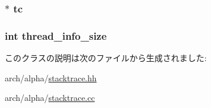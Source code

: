 \label{classAlphaISA_1_1ProcessInfo_a6bca839d8255baba5c53a5eace70d72e}
\hypertarget{classAlphaISA_1_1ProcessInfo_a4455a4759e69e5ebe68ae7298cbcc37d}{
\subsubsection[{tc}]{$\ast$ {\bf tc}}}
\label{classAlphaISA_1_1ProcessInfo_a4455a4759e69e5ebe68ae7298cbcc37d}
\hypertarget{classAlphaISA_1_1ProcessInfo_aa02520c2e86b94388e0d4f4a7b0873b3}{
\subsubsection[{thread\_\-info\_\-size}]{\setlength{\rightskip}{0pt plus 5cm}int {\bf thread\_\-info\_\-size}}}
\label{classAlphaISA_1_1ProcessInfo_aa02520c2e86b94388e0d4f4a7b0873b3}


このクラスの説明は次のファイルから生成されました:\begin{DoxyCompactItemize}
\item 
arch/alpha/\hyperlink{alpha_2stacktrace_8hh}{stacktrace.hh}\item 
arch/alpha/\hyperlink{alpha_2stacktrace_8cc}{stacktrace.cc}\end{DoxyCompactItemize}
